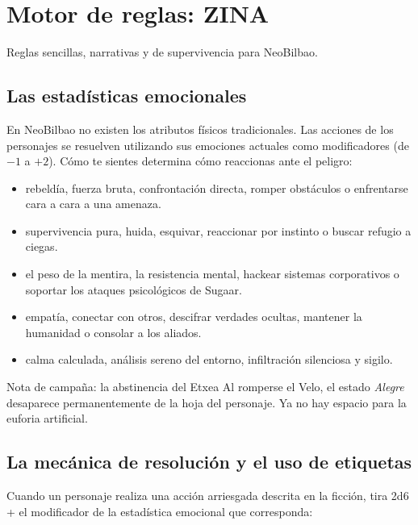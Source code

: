 \chapter{Motor de reglas: ZINA}

Reglas sencillas, narrativas y de supervivencia para NeoBilbao.

\section{Las estadísticas emocionales}

En NeoBilbao no existen los atributos físicos tradicionales. Las acciones de los personajes se resuelven utilizando sus emociones actuales como modificadores (de $-1$ a $+2$). Cómo te sientes determina cómo reaccionas ante el peligro:

\begin{itemize}
  \item {} rebeldía, fuerza bruta, confrontación directa, romper obstáculos o enfrentarse cara a cara a una amenaza.
  \item {} supervivencia pura, huida, esquivar, reaccionar por instinto o buscar refugio a ciegas.
  \item {} el peso de la mentira, la resistencia mental, hackear sistemas corporativos o soportar los ataques psicológicos de Sugaar.
  \item {} empatía, conectar con otros, descifrar verdades ocultas, mantener la humanidad o consolar a los aliados.
  \item {} calma calculada, análisis sereno del entorno, infiltración silenciosa y sigilo.
\end{itemize}

\begin{CajaRegla}{Nota de campaña: la abstinencia del Etxea}
Al romperse el Velo, el estado \emph{Alegre} desaparece permanentemente de la hoja del personaje. Ya no hay espacio para la euforia artificial.
\end{CajaRegla}

\section{La mecánica de resolución y el uso de etiquetas}

Cuando un personaje realiza una acción arriesgada descrita en la ficción, tira 2d6 + el modificador de la estadística emocional que corresponda:

